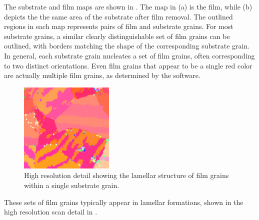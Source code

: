 The substrate and film maps are shown in . The map in
(a) is the film, while (b) depicts the the
same area of the substrate after film removal. The outlined regions in each map represents
pairs of film and substrate grains. For most substrate grains, a similar clearly
distinguishable set of film grains can be outlined, with borders matching the shape of the
corresponding substrate grain. In general, each substrate grain nucleates a set of film
grains, often corresponding to two distinct orientations. Even film grains that appear to
be a single red color are actually multiple film grains, as determined by the 
software. 
\begin{figure}
\begin{center}
	\includegraphics[width=0.4\textwidth]{zoommap.pdf}
		\caption[Detail of  map]{%
			High resolution  detail showing the lamellar
			structure of  film grains within a single substrate
			grain.}
	\label{fig:zoommap}
\end{center}
\end{figure}
These sets of film grains typically appear in lamellar formations, shown in the high
resolution scan detail in .

